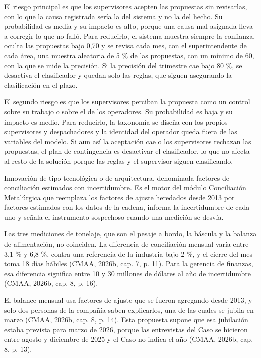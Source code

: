 \documentclass[subdoc]{../../comun/overfore}
\begin{document}
El riesgo principal es que los supervisores acepten las propuestas sin revisarlas, con lo que la causa registrada sería la del sistema y no la del hecho. Su probabilidad es media y su impacto es alto, porque una causa mal asignada lleva a corregir lo que no falló. Para reducirlo, el sistema muestra siempre la confianza, oculta las propuestas bajo 0,70 y se revisa cada mes, con el superintendente de cada área, una muestra aleatoria de 5 \% de las propuestas, con un mínimo de 60, con la que se mide la precisión. Si la precisión del trimestre cae bajo 80 \%, se desactiva el clasificador y quedan solo las reglas, que siguen asegurando la clasificación en el plazo.

El segundo riesgo es que los supervisores perciban la propuesta como un control sobre su trabajo o sobre el de los operadores. Su probabilidad es baja y su impacto es medio. Para reducirlo, la taxonomía se diseña con los propios supervisores y despachadores y la identidad del operador queda fuera de las variables del modelo. Si aun así la aceptación cae o los supervisores rechazan las propuestas, el plan de contingencia es desactivar el clasificador, lo que no afecta al resto de la solución porque las reglas y el supervisor siguen clasificando.

Innovación de tipo tecnológica o de arquitectura, denominada factores de conciliación estimados con incertidumbre. Es el motor del módulo Conciliación Metalúrgica que reemplaza los factores de ajuste heredados desde 2013 por factores estimados con los datos de la cadena, informa la incertidumbre de cada uno y señala el instrumento sospechoso cuando una medición se desvía.

Las tres mediciones de tonelaje, que son el pesaje a bordo, la báscula y la balanza de alimentación, no coinciden. La diferencia de conciliación mensual varía entre 3,1 \% y 6,8 \%, contra una referencia de la industria bajo 2 \%, y el cierre del mes toma 18 días hábiles (CMAA, 2026b, cap. 7, p. 11). Para la gerencia de finanzas, esa diferencia significa entre 10 y 30 millones de dólares al año de incertidumbre (CMAA, 2026b, cap. 8, p. 16).

El balance mensual usa factores de ajuste que se fueron agregando desde 2013, y solo dos personas de la compañía saben explicarlos, una de las cuales se jubila en marzo (CMAA, 2026b, cap. 8, p. 14). Esta propuesta supone que esa jubilación estaba prevista para marzo de 2026, porque las entrevistas del Caso se hicieron entre agosto y diciembre de 2025 y el Caso no indica el año (CMAA, 2026b, cap. 8, p. 13).
\end{document}
